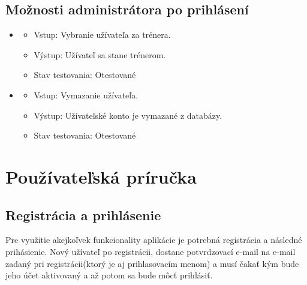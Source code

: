 \documentclass[12pt,a4paper]{report}
\theoremstyle{definition}
\theoremstyle{remark}
\begin{document}
\section{Možnosti administrátora po prihlásení}
\begin{itemize}
	\item\begin{itemize}
	\item Vstup: Vybranie užívateľa za trénera.
	\item Výstup: Užívateľ sa stane trénerom.
	\item Stav testovania: Otestované
	\end{itemize}
	
	
	\item\begin{itemize}
	\item Vstup: Vymazanie užívateľa.
	\item Výstup: Užívateľské konto je vymazané z databázy.
	\item Stav testovania: Otestované
	\end{itemize}
	
\end{itemize}

\chapter{Používateľská príručka}
\section{Registrácia a prihlásenie}
Pre využitie akejkoľvek funkcionality aplikácie je potrebná registrácia a následné prihásienie. Nový užívateľ po registrácii, dostane potvrdzovací e-mail na e-mail zadaný pri registrácii(ktorý je aj prihlasovacím menom) a musí čakať kým bude jeho účet aktivovaný a až potom sa bude môcť prihlásiť.
\end{document}
